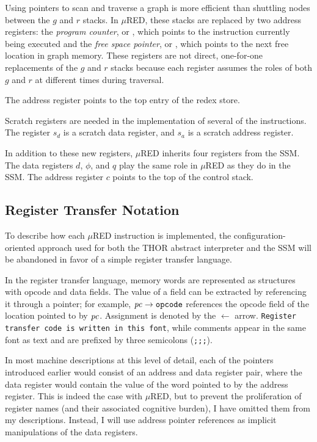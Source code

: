 Using pointers to scan and traverse a graph is more efficient than shuttling nodes between the \(g\) and \(r\) stacks. In \(\mu\)RED, these stacks are replaced by two address registers: the \emph{program counter}, or , which points to the instruction currently being executed and the \emph{free space pointer}, or , which points to the next free location in graph memory. These registers are not direct, one-for-one replacements of the \(g\) and \(r\) stacks because each register assumes the roles of both \(g\) and \(r\) at different times during traversal.

The address register  points to the top entry of the redex store.

Scratch registers are needed in the implementation of several of the instructions. The
register \(s_d\) is a scratch data register, and \(s_a\) is a scratch address register.

In addition to these new registers, \(\mu\)RED inherits four registers from the SSM. The data registers \(d\), \(\phi\), and \(q\) play the same role in \(\mu\)RED as they do in the SSM. The address register \(c\) points to the top of the control stack.

\subsection{Register Transfer Notation}

To describe how each \(\mu\)RED instruction is implemented, the configuration-oriented approach used for both the THOR abstract interpreter and the SSM will be abandoned in favor of a simple register transfer language.

In the register transfer language, memory words are represented as structures with opcode and data fields. The value of a field can be extracted by referencing it through a pointer; for example, \(\mathit{pc}\rightarrow\mathtt{opcode}\) references the opcode field of the location pointed to by \(\mathit{pc}\). Assignment is denoted by the \(\leftarrow\) arrow. \texttt{Register transfer code is written in this font}, while comments appear in the same font as text and are prefixed by three semicolons (\texttt{;;;}).

In most machine descriptions at this level of detail, each of the pointers introduced earlier would consist of an address and data register pair, where the data register would contain the value of the word pointed to by the address register. This is indeed the case with \(\mu\)RED, but to prevent the proliferation of register names (and their associated cognitive burden), I have omitted them from my descriptions. Instead, I will use address pointer references as implicit manipulations of the data registers.

